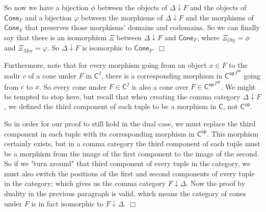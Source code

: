 \documentclass[../../main]{subfiles}
\begin{document}
So now we have a bijection $ \phi $ between the objects of $ \Delta \downarrow F $ and the objects of $ \mathsf{Cone}_F $ and a bijection $ \varphi $ between the morphisms of $ \Delta \downarrow F $ and the morphisms of $ \mathsf{Cone}_F $ that preserves those morphisms' domains and codomains. So we can finally say that there is an isomorphism $ \Xi $ between $ \Delta \downarrow F $ and $ \mathsf{Cone}_F $, where $ \Xi_{Obj} = \phi $ and $ \Xi_{Mor} = \varphi $. So $ \Delta \downarrow F $ is isomorphic to $ \mathsf{Cone}_F $. $ \Box $

\bigskip %

Furthermore, note that for every morphism going from an object $ x \in F $ to the nadir $ c $ of a cone under $ F $ in $ \mathsf{C^J} $, there is a corresponding morphism in $ \mathsf{{C^{op}}^{J^{op}}} $ going from $ c $ to $ x $. So every cone under $ F \in \mathsf{C^J} $ is also a cone over $ F \in \mathsf{{C^{op}}^{J^{op}}} $. We might be tempted to stop here, but recall that when creating the comma category $ \Delta \downarrow F $, we defined the third component of each tuple to be a morphism in $ \mathsf{C} $, not $ \mathsf{C^{op}} $. 

So in order for our proof to still hold in the dual case, we must replace the third component in each tuple with its corresponding morphism in $ \mathsf{C^{op}} $. This morphism certainly exists, but in a comma category the third component of each tuple must be a morphism from the image of the first component to the image of the second. So if we "turn around" that third component of every tuple in the category, we must also switch the positions of the first and second components of every tuple in the category; which gives us the comma category $ F \downarrow \Delta $. Now the proof by duality in the previous paragraph is valid, which means the category of cones under $ F $ is in fact isomorphic to $ F \downarrow \Delta $. $ \Box $

  
\end{document}

